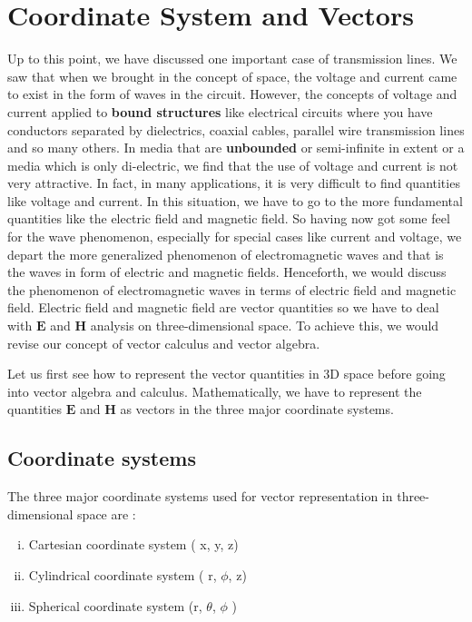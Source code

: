 \chapter{Coordinate System and Vectors}
Up to this point, we have discussed one important case of transmission lines. We saw that when we brought in the concept of space, the voltage and current came to exist in the form of waves in the circuit. However, the concepts of voltage and current applied to \textbf{bound structures} like electrical circuits where you have conductors separated by dielectrics, coaxial cables, parallel wire transmission lines and so many others. In media that are \textbf{unbounded} or semi-infinite in extent or a media which is only di-electric, we find that the use of voltage and current is not very attractive. In fact, in many applications, it is very difficult to find quantities like voltage and current. In this situation, we have to go to the more fundamental quantities like the electric field and magnetic field. So having now got some feel for the wave phenomenon, especially for special cases like current and voltage, we depart the more generalized phenomenon of electromagnetic waves and that is the waves in form of electric and magnetic fields. Henceforth, we would discuss the phenomenon of electromagnetic waves in terms of electric field and magnetic field. Electric field and magnetic field are vector quantities so we have to deal with $\boldsymbol{E}$ and $\boldsymbol{H}$ analysis on three-dimensional space. To achieve this, we would revise our concept of vector calculus and vector algebra.

Let us first see how to represent the vector quantities in 3D space before going into vector algebra and calculus. Mathematically, we have to represent the quantities $\boldsymbol{E}$ and $\boldsymbol{H}$ as vectors in the three major coordinate systems.

\section{Coordinate systems}
The three major coordinate systems  used for vector representation in three-dimensional space are :
\begin{enumerate}[(i)]
\item Cartesian coordinate system ( x, y, z)
\item Cylindrical coordinate system ( r, $\phi$, z)
\item Spherical coordinate system (r,  $\theta$, $\phi$ )
\end{enumerate}

